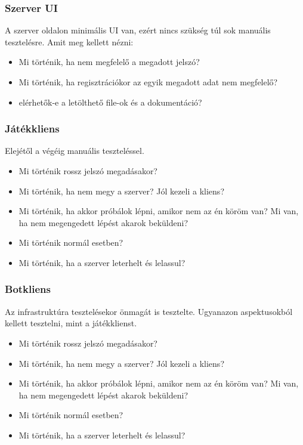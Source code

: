 \documentclass[twoside, a4paper, 12pt]{article}
\begin{document}
\subsubsection{Szerver UI}
A szerver oldalon minimális UI van, ezért nincs szükség túl sok manuális tesztelésre. Amit meg kellett nézni:
\begin{itemize}
	\item Mi történik, ha nem megfelelő a megadott jelszó?
	\item Mi történik, ha regisztrációkor az egyik megadott adat nem megfelelő?
	\item elérhetők-e a letölthető file-ok és a dokumentáció?
\end{itemize}

\subsubsection{Játékkliens}
Elejétől a végéig manuális teszteléssel.
\begin{itemize}
	\item Mi történik rossz jelszó megadásakor?
	\item Mi történik, ha nem megy a szerver? Jól kezeli a kliens?
	\item Mi történik, ha akkor próbálok lépni, amikor nem az én köröm van? Mi van, ha nem megengedett lépést akarok beküldeni?
	\item Mi történik normál esetben?
	\item Mi történik, ha a szerver leterhelt és lelassul?
\end{itemize}


\subsubsection{Botkliens}
Az infrastruktúra tesztelésekor önmagát is tesztelte. Ugyanazon aspektusokból kellett tesztelni, mint a játékklienst.
\begin{itemize}
	\item Mi történik rossz jelszó megadásakor?
	\item Mi történik, ha nem megy a szerver? Jól kezeli a kliens?
	\item Mi történik, ha akkor próbálok lépni, amikor nem az én köröm van? Mi van, ha nem megengedett lépést akarok beküldeni?
	\item Mi történik normál esetben?
	\item Mi történik, ha a szerver leterhelt és lelassul?
\end{itemize}
\end{document}
